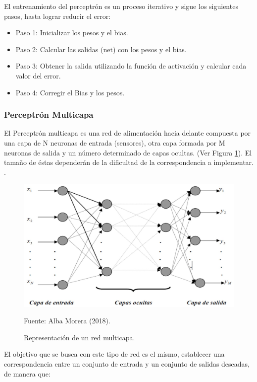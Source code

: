 El entrenamiento del perceptrón es un proceso iterativo y sigue los siguientes pasos, hasta lograr reducir el error:
\begin{itemize}
    \item Paso 1: Inicializar los pesos y el bias.
\item Paso 2: Calcular las salidas (net) con los pesos y el bias.
\item Paso 3: Obtener la salida utilizando la función de activación y calcular cada valor del error.
\item Paso 4: Corregir el Bias y los pesos.
\end{itemize}

\subsubsection{Perceptrón Multicapa}
El Perceptrón multicapa es una red de alimentación hacia delante compuesta por una capa de N
neuronas de entrada (sensores), otra capa formada por M neuronas de salida y un número determinado
de capas ocultas. (Ver Figura \ref{Fig:21}). El tamaño de éstas dependerán de la dificultad de la correspondencia
a implementar. \citep{muntintroduccion}.

\begin{figure}[h!]
	\centering
		\includegraphics[scale=0.4]{imagenes/perpceMultiCapa.jpg}
		\caption{Representación de un red multicapa.}
		\begin{center}
    Fuente: Alba Morera (2018).
    \end{center}
	\label{Fig:21}
\end{figure}
\newpage
El objetivo que se busca con este tipo de red es el mismo, establecer una correspondencia entre un
conjunto de entrada y un conjunto de salidas deseadas, de manera que:

